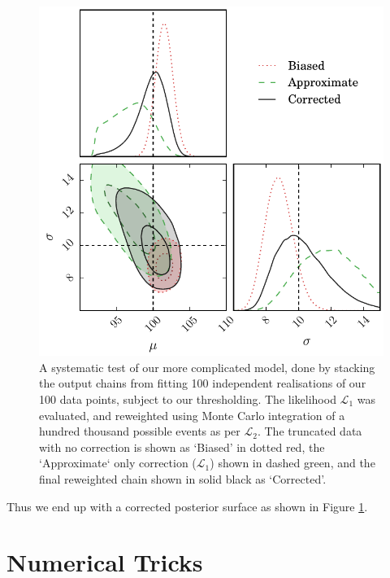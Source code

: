 \documentclass[a4paper,fleqn,usenatbib]{mnras}
\begin{document}
\begin{figure}
	\begin{center}
		\includegraphics[width=\columnwidth]{example/real.pdf}
	\end{center}
	\caption{A systematic test of our more complicated model, done by stacking the output chains from fitting 100 independent realisations of our 100 data points, subject to our thresholding. The likelihood $\mathcal{L}_1$ was evaluated, and reweighted using Monte Carlo integration of a hundred thousand possible events as per $\mathcal{L}_2$. The truncated data with no correction is shown as `Biased' in dotted red, the `Approximate` only correction ($\mathcal{L}_1$) shown in dashed green, and the final reweighted chain shown in solid black as `Corrected'.}
	\label{fig:real}
\end{figure}
Thus we end up with a corrected posterior surface as shown in Figure \ref{fig:real}.














\section{Numerical Tricks}
\label{sec:tricks}
\end{document}
